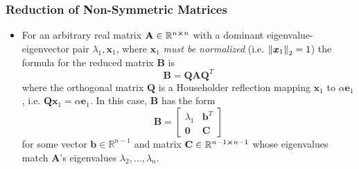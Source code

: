 \documentclass[11pt, a4paper]{article}
\newcommand{\R}{\mathbb{R}} %
\newcommand{\mat}[1]{\mathbf{#1}} %
\begin{document}
\subsubsection{Reduction of Non-Symmetric Matrices}
\begin{itemize}
	\item For an arbitrary real matrix $ \mat{A} \in \R^{n\cross n} $ with a dominant eigenvalue-eigenvector pair $ \lambda_1, \bm{x}_1 $, where $ \bm{x}_{1} $ \textit{must be normalized} (i.e. $ \norm{\bm{x}_{1}}_{2} = 1 $) the formula for the reduced matrix $ \mat{B} $ is
	\begin{equation*}
		\mat{B} = \mat{Q}\mat{A}\mat{Q}^{T} 
	\end{equation*}
	where the orthogonal matrix $ \mat{Q} $ is a Householder reflection mapping $ \bm{x}_{1} $ to $ \alpha \bm{e}_{1} $, i.e. $ \mat{Q}\bm{x}_1  = \alpha \bm{e}_1$. In this case, $ \mat{B} $ has the form
	\begin{equation*}
		\mat{B} = \begin{bmatrix}
			\lambda_{1} & \bm{b}^{T}\\
			\bm{0} & \mat{C}
		\end{bmatrix}
	\end{equation*}
	for some vector $ \bm{b} \in \R^{n - 1} $ and matrix $ \mat{C} \in \R^{n-1 \cross n-1}  $ whose eigenvalues match $ \mat{A} $'s eigenvalues $ \lambda_{2}, \ldots, \lambda_{n} $.
	
	
\end{itemize}
\end{document}
